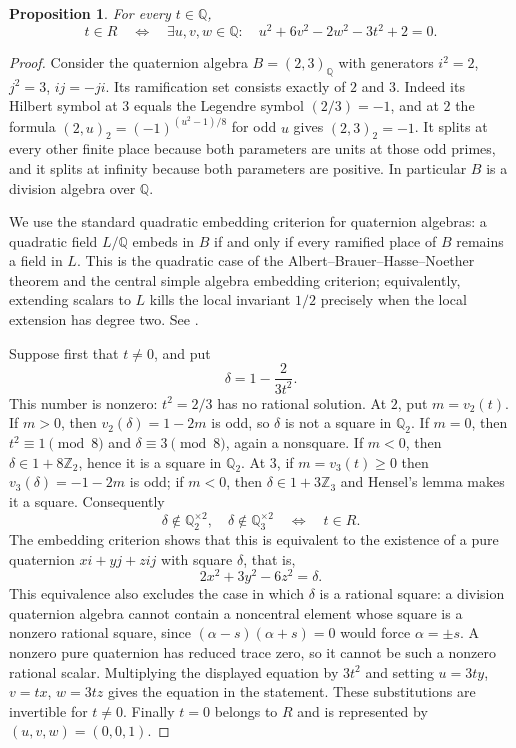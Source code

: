 \documentclass[11pt]{article}
\newtheorem{proposition}[theorem]{Proposition}
\theoremstyle{definition}
\begin{document}
\begin{proposition}\label{prop:explicit-semilocal}
For every $t\in\mathbb Q$,
\[
 t\in R\quad\Longleftrightarrow\quad
 \exists u,v,w\in\mathbb Q:\quad
 u^2+6v^2-2w^2-3t^2+2=0.
\]
\end{proposition}
\begin{proof}
Consider the quaternion algebra $B=(2,3)_{\mathbb Q}$ with generators
$i^2=2$, $j^2=3$, $ij=-ji$. Its ramification set consists exactly of
$2$ and $3$. Indeed its Hilbert symbol at $3$ equals the Legendre symbol
$(2/3)=-1$, and at $2$ the formula
$(2,u)_2=(-1)^{(u^2-1)/8}$ for odd $u$ gives $(2,3)_2=-1$.
It splits at every other finite place because both parameters are units
at those odd primes, and it splits at
infinity because both parameters are positive. In particular $B$ is a
division algebra over $\mathbb Q$.

We use the standard quadratic embedding criterion for quaternion algebras:
a quadratic field $L/\mathbb Q$ embeds in $B$ if and only if every ramified
place of $B$ remains a field in $L$. This is the quadratic case of the
Albert--Brauer--Hasse--Noether theorem and the central simple algebra
embedding criterion; equivalently, extending scalars to $L$ kills the
local invariant $1/2$ precisely when the local extension has degree two.
See \cite[Proposition 14.6.7]{Voight2021}.

Suppose first that $t\ne0$, and put
\[
 \delta=1-\frac{2}{3t^2}.
\]
This number is nonzero: $t^2=2/3$ has no rational solution.
At $2$, put $m=v_2(t)$. If $m>0$, then $v_2(\delta)=1-2m$ is odd,
so $\delta$ is not a square in $\mathbb Q_2$. If $m=0$, then
$t^2\equiv1\pmod8$ and $\delta\equiv3\pmod8$, again a nonsquare.
If $m<0$, then $\delta\in1+8\mathbb Z_2$, hence it is a square in
$\mathbb Q_2$. At $3$, if $m=v_3(t)\ge0$ then
$v_3(\delta)=-1-2m$ is odd; if $m<0$, then
$\delta\in1+3\mathbb Z_3$ and Hensel's lemma makes it a square.
Consequently
\[
 \delta\notin\mathbb Q_2^{\times2},\quad
 \delta\notin\mathbb Q_3^{\times2}
 \quad\Longleftrightarrow\quad t\in R.
\]
The embedding criterion shows that this is equivalent to the existence
of a pure quaternion $xi+yj+zij$ with square $\delta$, that is,
\[
 2x^2+3y^2-6z^2=\delta.
\]
This equivalence also excludes the case in which $\delta$ is a rational
square: a division quaternion algebra cannot contain a noncentral element
whose square is a nonzero rational square, since
$(\alpha-s)(\alpha+s)=0$ would force $\alpha=\pm s$.
A nonzero pure quaternion has reduced trace zero, so it cannot be such
a nonzero rational scalar.
Multiplying the displayed equation by $3t^2$ and setting
$u=3ty$, $v=tx$, $w=3tz$ gives the equation in the statement.
These substitutions are invertible for $t\ne0$.
Finally $t=0$ belongs to $R$ and is represented by $(u,v,w)=(0,0,1)$.
\end{proof}
\end{document}
